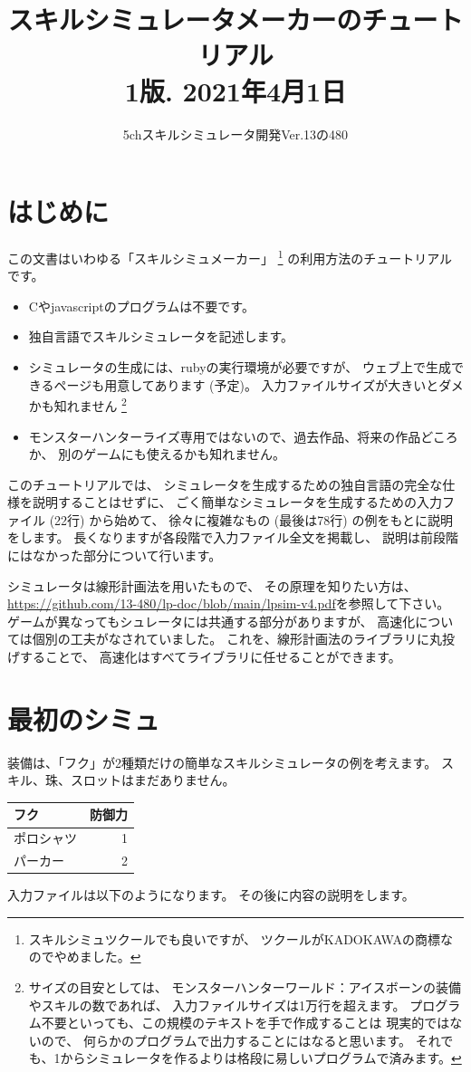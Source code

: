 \documentclass[dvipdfmx]{jsarticle}
\title{スキルシミュレータメーカーのチュートリアル
\\
{\small 1版. 2021年4月1日}
}
\date{}
\author{5chスキルシミュレータ開発Ver.13の480}
\begin{document}
\maketitle
\tableofcontents

\section{はじめに} %
この文書はいわゆる「スキルシミュメーカー」%
\footnote{スキルシミュツクールでも良いですが、
ツクールがKADOKAWAの商標なのでやめました。}%
の利用方法のチュートリアルです。

\begin{itemize}
\item 
Cやjavascriptのプログラムは不要です。
\item 
独自言語でスキルシミュレータを記述します。
\item 
シミュレータの生成には、rubyの実行環境が必要ですが、
ウェブ上で生成できるページも用意してあります (予定)。
入力ファイルサイズが大きいとダメかも知れません%
\footnote{%
サイズの目安としては、
モンスターハンターワールド：アイスボーンの装備やスキルの数であれば、
入力ファイルサイズは1万行を超えます。
プログラム不要といっても、この規模のテキストを手で作成することは
現実的ではないので、
何らかのプログラムで出力することにはなると思います。
それでも、1からシミュレータを作るよりは格段に易しいプログラムで済みます。
}
\item 
モンスターハンターライズ専用ではないので、過去作品、将来の作品どころか、
別のゲームにも使えるかも知れません。
\end{itemize}

このチュートリアルでは、
シミュレータを生成するための独自言語の完全な仕様を説明することはせずに、
ごく簡単なシミュレータを生成するための入力ファイル (22行) から始めて、
徐々に複雑なもの (最後は78行) の例をもとに説明をします。
長くなりますが各段階で入力ファイル全文を掲載し、
説明は前段階にはなかった部分について行います。

シミュレータは線形計画法を用いたもので、
その原理を知りたい方は、
\url{https://github.com/13-480/lp-doc/blob/main/lpsim-v4.pdf}を参照して下さい。
ゲームが異なってもシュレータには共通する部分がありますが、
高速化については個別の工夫がなされていました。
これを、線形計画法のライブラリに丸投げすることで、
高速化はすべてライブラリに任せることができます。

\section{最初のシミュ} %
装備は、「フク」が2種類だけの簡単なスキルシミュレータの例を考えます。
スキル、珠、スロットはまだありません。
%
\begin{center}
\begin{tabular}{lr}
\toprule
フク       & 防御力 \\
\midrule
ポロシャツ & 1 \\
パーカー   & 2 \\
\bottomrule
\end{tabular}
\end{center}
%
入力ファイルは以下のようになります。
その後に内容の説明をします。
\medskip
\end{document}
